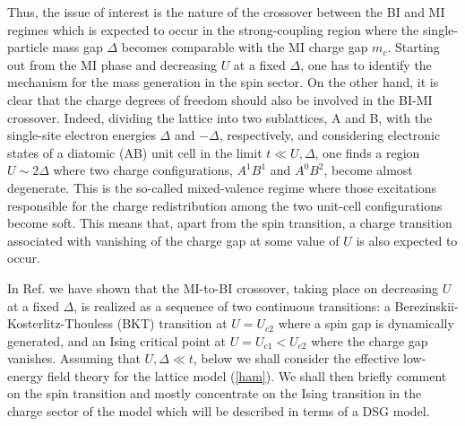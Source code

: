 Thus, the issue of interest is the nature of the crossover between the BI and MI
regimes which is expected to occur in the strong-coupling region where the
single-particle mass gap $\Delta$ becomes comparable with the MI charge gap
$m_c$.
Starting out from the MI phase and decreasing $U$ at a fixed $\Delta$,
one has to identify the mechanism
for the mass generation in the spin sector. On the other hand,
it is clear that the charge degrees of freedom should also be involved
in the BI-MI crossover. Indeed,
dividing the lattice into two sublattices, A and B, with the single-site
electron energies $\Delta$ and $-\Delta$, respectively, and
considering
electronic states of a diatomic (AB) unit cell in
the limit $t \ll U, \Delta$, one finds a region $U \sim 2\Delta$ where
two charge
configurations, $A^1 B^1$ and $A^0 B^2$, become almost degenerate. This is the
so-called mixed-valence regime where those excitations responsible for
the charge redistribution among the two unit-cell configurations become soft.
This means that, apart from the spin transition, a charge transition associated
with vanishing of the charge gap at some value of $U$ is also expected
to occur.

In Ref.\cite{FGN} we have shown that the MI-to-BI crossover, taking place
on decreasing $U$ at a fixed $\Delta$, is realized as a sequence of two
continuous transitions: a Berezinskii-Kosterlitz-Thouless (BKT) transition
at $U = U_{c2}$ where a spin gap is dynamically generated, and an Ising
critical point at $U = U_{c1} < U_{c2}$ where the charge gap vanishes.
Assuming that $U, \Delta \ll t$,
below we
shall consider the effective low-energy field theory for the lattice model
(\ref{ham}). We shall then briefly comment on the spin transition and
mostly concentrate
on the Ising transition in the charge sector of the model which will be
described in terms of a DSG model.

